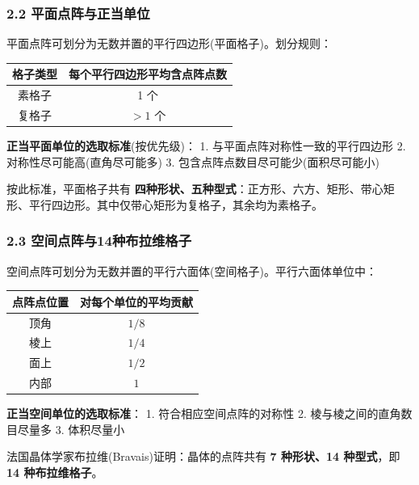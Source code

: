 \documentclass[a4paper,11pt]{ctexart}
\newcounter{none}
\newcommand{\箭}{\ensuremath{\rightarrow}}
\newcommand{\左箭}{\ensuremath{\leftarrow}}
\newcommand{\上箭}{\ensuremath{\uparrow}}
\newcommand{\下箭}{\ensuremath{\downarrow}}
\newcommand{\衡}{\ensuremath{\rightleftharpoons}}
\newcommand{\双箭}{\ensuremath{\leftrightarrow}}
\newcommand{\约等于}{\ensuremath{\approx}}
\newcommand{\小于等于}{\ensuremath{\leq}}
\newcommand{\大于等于}{\ensuremath{\geq}}
\newcommand{\不等于}{\ensuremath{\neq}}
\newcommand{\西格马}{\ensuremath{\sigma}}
\newcommand{\派}{\ensuremath{\pi}}
\begin{document}
\subsubsection{2.2 平面点阵与正当单位}\label{ux5e73ux9762ux70b9ux9635ux4e0eux6b63ux5f53ux5355ux4f4d}

平面点阵可划分为无数并置的平行四边形(平面格子)。划分规则：

{\def\LTcaptype{none} %
\begin{longtable}[]{@{}cc@{}}
\toprule\noalign{}
格子类型 & 每个平行四边形平均含点阵点数 \\
\midrule\noalign{}
\endhead
\bottomrule\noalign{}
\endlastfoot
素格子 & 1 个 \\
复格子 & \(>1\) 个 \\
\end{longtable}
}

\textbf{正当平面单位的选取标准}(按优先级)：
1. 与平面点阵对称性一致的平行四边形
2. 对称性尽可能高(直角尽可能多)
3. 包含点阵点数目尽可能少(面积尽可能小)

按此标准，平面格子共有 \textbf{四种形状、五种型式}：正方形、六方、矩形、带心矩形、平行四边形。其中仅带心矩形为复格子，其余均为素格子。

\subsubsection{2.3 空间点阵与14种布拉维格子}\label{ux7a7aux95f4ux70b9ux9635ux4e0e14ux79cdux5e03ux62c9ux7ef4ux683cux5b50}

空间点阵可划分为无数并置的平行六面体(空间格子)。平行六面体单位中：

{\def\LTcaptype{none} %
\begin{longtable}[]{@{}cc@{}}
\toprule\noalign{}
点阵点位置 & 对每个单位的平均贡献 \\
\midrule\noalign{}
\endhead
\bottomrule\noalign{}
\endlastfoot
顶角 & \(1/8\) \\
棱上 & \(1/4\) \\
面上 & \(1/2\) \\
内部 & \(1\) \\
\end{longtable}
}

\textbf{正当空间单位的选取标准}：
1. 符合相应空间点阵的对称性
2. 棱与棱之间的直角数目尽量多
3. 体积尽量小

法国晶体学家布拉维(Bravais)证明：晶体的点阵共有 \textbf{7 种形状、14 种型式}，即 \textbf{14 种布拉维格子}。
\end{document}

